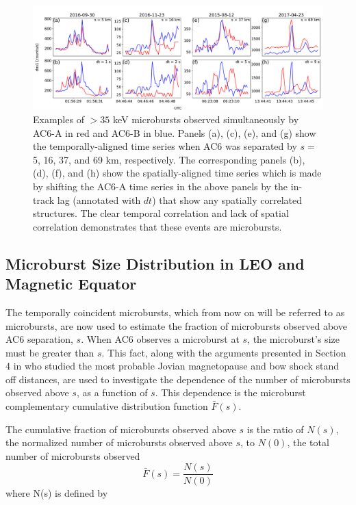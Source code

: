 \documentclass[draft]{agujournal2019}
\begin{document}
\begin{figure}
\includegraphics[width=\textwidth]{fig2.pdf}
\caption{Examples of $>35$ keV microbursts observed simultaneously by AC6-A in red and AC6-B in blue. Panels (a), (c), (e), and (g) show the temporally-aligned time series when AC6 was separated by $s=$ 5, 16, 37, and 69 km, respectively. The corresponding panels (b), (d), (f), and (h) show the spatially-aligned time series which is made by shifting the AC6-A time series in the above panels by the in-track lag (annotated with $dt$) that show any spatially correlated structures. The clear temporal correlation and lack of spatial correlation demonstrates that these events are microbursts.} 
\label{fig2}
\end{figure}
	

\subsection{Microburst Size Distribution in LEO and Magnetic Equator}\label{microburst_distribution}
The temporally coincident microbursts, which from now on will be referred to as microbursts, are now used to estimate the fraction of microbursts observed above AC6 separation, $s$. When AC6 observes a microburst at $s$, the microburst's size must be greater than $s$. This fact, along with the arguments presented in Section 4 in  who studied the most probable Jovian magnetopause and bow shock stand off distances, are used to investigate the dependence of the number of microbursts observed above $s$, as a function of $s$. This dependence is the microburst complementary cumulative distribution function $\bar{F}(s)$. 

The cumulative fraction of microbursts observed above $s$ is the ratio of $N(s)$, the normalized number of microbursts observed above $s$, to $N(0)$, the total number of microbursts observed 
\begin{equation}
\bar{F}(s) = \frac{N(s)}{N(0)}
\end{equation} where N(s) is defined by
\end{document}
